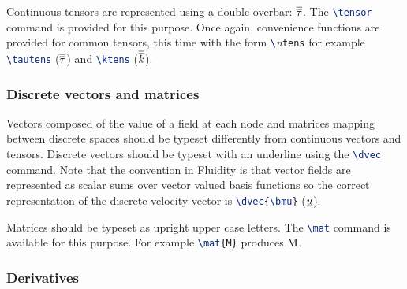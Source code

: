 Continuous tensors are represented using a double overbar:
$\overline{\overline{\tau}}$. The \lstinline[language=TeX]+\tensor+ command is provided
for this purpose. Once again, convenience functions are provided for common
tensors, this time with the form
\lstinline[language=TeX]+\+\textit{n}\lstinline[language=TeX]+tens+ for
example \lstinline[language=TeX]+\tautens+ ($\overline{\overline{\tau}}$) and
\lstinline[language=TeX]+\ktens+ ($\overline{\overline{k}}$).

\subsubsection{Discrete vectors and matrices}

Vectors composed of the value of a field at each node and matrices mapping
between discrete spaces should be typeset differently from continuous
vectors and tensors. Discrete vectors should be typeset with an underline
using the \lstinline[language=TeX]+\dvec+ command. Note that the convention
in Fluidity is that vector fields are represented as scalar sums over vector
valued basis functions so the correct representation of the discrete
velocity vector is \lstinline[language=TeX]+\dvec{\bmu}+ ($\underline{u}$).

Matrices should be typeset as upright upper case letters. The
\lstinline[language=TeX]+\mat+ command is available for this purpose. For
example \lstinline[language=TeX]+\mat{M}+ produces $\mathrm{M}$.

\subsubsection{Derivatives}

